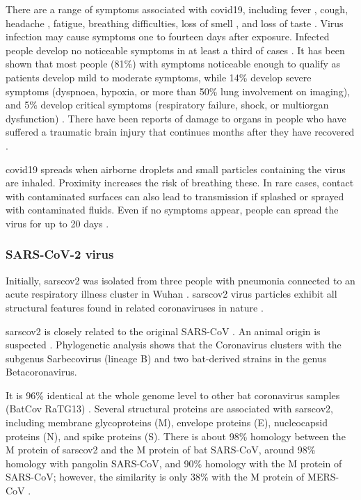         There are a range of symptoms associated with \acrshort{covid19}, including fever \cite{islam2021}, cough, headache \cite{islam2021}, fatigue, breathing difficulties, loss of smell  \cite{saniasiaya2021,saniasiaya2021b}, and loss of taste \cite{saniasiaya2021b,agyeman2020}. Virus infection may cause symptoms one to fourteen days after exposure. Infected people develop no noticeable symptoms in at least a third of cases \cite{oran2021}. It has been shown that most people (81\%) with symptoms noticeable enough to qualify as patients develop mild to moderate symptoms, while 14\% develop severe symptoms (dyspnoea, hypoxia, or more than 50\% lung involvement on imaging), and 5\% develop critical symptoms (respiratory failure, shock, or multiorgan dysfunction) \cite{management2020}. There have been reports of damage to organs in people who have suffered a  traumatic brain injury that continues months after they have recovered \cite{cdc2022}.
        
        \acrshort{covid19} spreads when airborne droplets and small particles containing the virus are inhaled. Proximity increases the risk of breathing these. In rare cases, contact with contaminated surfaces can also lead to transmission if splashed or sprayed with contaminated fluids. Even if no symptoms appear, people can spread the virus for up to 20 days \cite{cdc2020b}.

        \subsubsection{SARS-CoV-2 virus}
        Initially, \acrshort{sarscov2} was isolated from three people with pneumonia connected to an acute respiratory illness cluster in Wuhan \cite{risk}. \acrshort{sarscov2} virus particles exhibit all structural features found in related coronaviruses in nature \cite{andersen2020}.
        
        \acrshort{sarscov2} is closely related to the original SARS-CoV \cite{zhu2020}. An animal origin is suspected \cite{zhou2020}. Phylogenetic analysis shows that the Coronavirus clusters with the subgenus Sarbecovirus (lineage B) and two bat-derived strains in the genus Betacoronavirus. 
        
        It is 96\% identical at the whole genome level to other bat coronavirus samples (BatCov RaTG13) \cite{rathore2020}. Several structural proteins are associated with \acrshort{sarscov2}, including membrane glycoproteins (M), envelope proteins (E), nucleocapsid proteins (N), and spike proteins (S). There is about 98\% homology between the M protein of \acrshort{sarscov2} and the M protein of bat SARS-CoV, around 98\% homology with pangolin SARS-CoV, and 90\% homology with the M protein of SARS-CoV; however, the similarity is only 38\% with the M protein of MERS-CoV \cite{thomas2020}.
        
